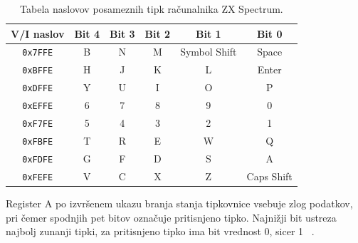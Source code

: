 \documentclass[a4paper, 12pt, openright]{book}
\begin{document}
    \begin{table}[htb]
        \begin{center}
            \begin{tabular}{|c|c|c|c|c|c|}
                \hline
                \textbf{V/I naslov} & \textbf{Bit 4} & \textbf{Bit 3} & \textbf{Bit 2} & \textbf{Bit 1} & \textbf{Bit 0} \\
                \hline
                \texttt{0x7FFE}     & B              & N              & M              & Symbol Shift   & Space          \\
                \hline
                \texttt{0xBFFE}     & H              & J              & K              & L              & Enter          \\
                \hline
                \texttt{0xDFFE}     & Y              & U              & I              & O              & P              \\
                \hline
                \texttt{0xEFFE}     & 6              & 7              & 8              & 9              & 0              \\
                \hline
                \texttt{0xF7FE}     & 5              & 4              & 3              & 2              & 1              \\
                \hline
                \texttt{0xFBFE}     & T              & R              & E              & W              & Q              \\
                \hline
                \texttt{0xFDFE}     & G              & F              & D              & S              & A              \\
                \hline
                \texttt{0xFEFE}     & V              & C              & X              & Z              & Caps Shift     \\
                \hline
            \end{tabular}
        \end{center}
        \caption{Tabela naslovov posameznih tipk računalnika ZX Spectrum.}
        \label{spectrumkeyboard_tab1}
    \end{table}

    Register A po izvršenem ukazu branja stanja tipkovnice vsebuje zlog podatkov,
    pri čemer spodnjih pet bitov označuje pritisnjeno tipko. Najnižji bit ustreza
    najbolj zunanji tipki, za pritisnjeno tipko ima bit vrednost 0, sicer 1 ~\cite{strojnijezikzaprocesorz80,
    zxspectrumbasicprogramming}.
\end{document}
